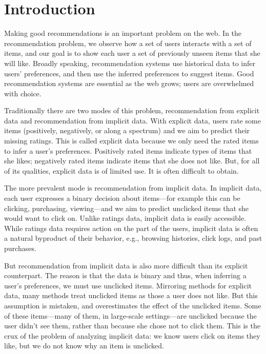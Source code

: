 \documentclass{sig-alternate-arxiv}
\begin{document}
\section{Introduction}
\label{sec:introduction}

Making good recommendations is an important problem on the web. In the
recommendation problem, we observe how a set of users interacts with a
set of items, and our goal is to show each user a set of previously
unseen items that she will like.  Broadly speaking, recommendation
systems use historical data to infer users' preferences, and then use
the inferred preferences to suggest items.  Good recommendation
systems are essential as the web grows; users are overwhelmed with
choice.

Traditionally there are two modes of this problem, recommendation from
explicit data and recommendation from implicit data.  With explicit
data, users rate some items (positively, negatively, or along a
spectrum) and we aim to predict their missing ratings.  This is called
explicit data because we only need the rated items to infer a user's
preferences. Positively rated items indicate types of items that she
likes; negatively rated items indicate items that she does not like.
But, for all of its qualities, explicit data is of limited use. It is
often difficult to obtain.

The more prevalent mode is recommendation from implicit data.  In
implicit data, each user expresses a binary decision about items---for
example this can be clicking, purchasing, viewing---and we aim to
predict unclicked items that she would want to click on. Unlike
ratings data, implicit data is easily accessible.  While ratings data
requires action on the part of the users, implicit data is often a
natural byproduct of their behavior, e.g., browsing histories, click
logs, and past purchases.

But recommendation from implicit data is also more difficult than its
explicit counterpart.  The reason is that the data is binary and thus,
when inferring a user's preferences, we must use unclicked items.
Mirroring methods for explicit data, many methods treat unclicked
items as those a user does not like.  But this assumption is mistaken,
and overestimates the effect of the unclicked items.  Some of these
items---many of them, in large-scale settings---are unclicked because
the user didn't see them, rather than because she chose not to
click them.  This is the crux of the problem of analyzing implicit
data: we know users click on items they like, but we do not know why
an item is unclicked.
\end{document}
